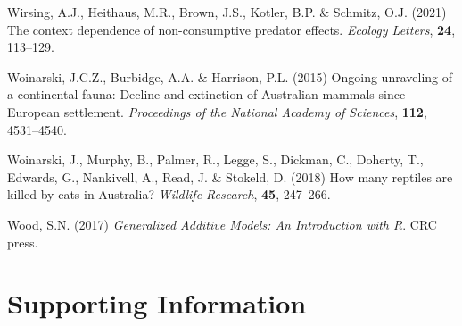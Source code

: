 \documentclass[]{elsarticle} %
\begin{document}
\leavevmode\hypertarget{ref-wirsing2021context}{}%
Wirsing, A.J., Heithaus, M.R., Brown, J.S., Kotler, B.P. \& Schmitz, O.J. (2021) The context dependence of non-consumptive predator effects. \emph{Ecology Letters}, \textbf{24}, 113--129.

\leavevmode\hypertarget{ref-woinarski2015ongoing}{}%
Woinarski, J.C.Z., Burbidge, A.A. \& Harrison, P.L. (2015) Ongoing unraveling of a continental fauna: Decline and extinction of Australian mammals since European settlement. \emph{Proceedings of the National Academy of Sciences}, \textbf{112}, 4531--4540.

\leavevmode\hypertarget{ref-woinarski2018reptiles}{}%
Woinarski, J., Murphy, B., Palmer, R., Legge, S., Dickman, C., Doherty, T., Edwards, G., Nankivell, A., Read, J. \& Stokeld, D. (2018) How many reptiles are killed by cats in Australia? \emph{Wildlife Research}, \textbf{45}, 247--266.

\leavevmode\hypertarget{ref-wood2017generalized}{}%
Wood, S.N. (2017) \emph{Generalized Additive Models: An Introduction with R}. CRC press.

\newpage

\setcounter{table}{0}  \renewcommand{\thetable}{S\arabic{table}} \setcounter{figure}{0} \renewcommand{\thefigure}{S\arabic{figure}} \setcounter{section}{0} \renewcommand{\thesection}{S\arabic{section}}

\hypertarget{supporting-information}{%
\section*{Supporting Information}\label{supporting-information}}

\newpage

\(~\)

\(~\)

\(~\)

\begingroup\fontsize{10}{12}\selectfont
\end{document}

